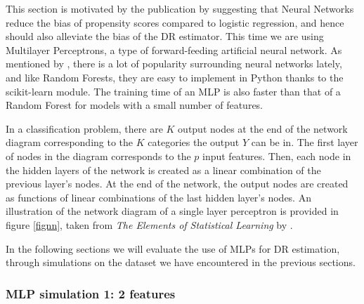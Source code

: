 \documentclass[12pt,twoside]{article}
\begin{document}
This section is motivated by the publication by \citet{setoguchi-nn} suggesting that Neural Networks reduce the bias of propensity scores compared to logistic regression, and hence should also alleviate the bias of the DR estimator. This time we are using Multilayer Perceptrons, a type of forward-feeding artificial neural network. As mentioned by \citet{hastieESL}, there is a lot of popularity surrounding neural networks lately, and like Random Forests, they are easy to implement in Python thanks to the scikit-learn module. The training time of an MLP is also faster than that of a Random Forest for models with a small number of features. 

In a classification problem, there are $K$ output nodes at the end of the network diagram corresponding to the $K$ categories the output $Y$ can be in. The first layer of nodes in the diagram corresponds to the $p$ input features. Then, each node in the hidden layers of the network is created as a linear combination of the previous layer's nodes. At the end of the network, the output nodes are created as functions of linear combinations of the last hidden layer's nodes. An illustration of the network diagram of a single layer perceptron is provided in figure \ref{fignn}, taken from \textit{The Elements of Statistical Learning} by \citet{hastieESL}.

In the following sections we will evaluate the use of MLPs for DR estimation, through simulations on the dataset we have encountered in the previous sections.

\subsubsection{MLP simulation 1: 2 features}
\end{document}
